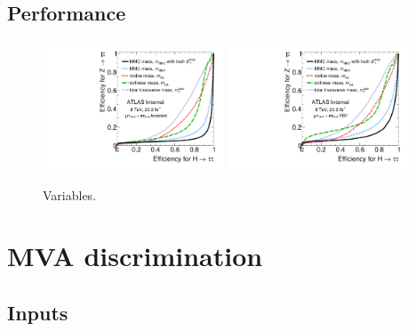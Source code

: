 \subsection{Performance}
\label{sec:strategy-mtautau-performance}

\begin{figure}[tp]
  \centering
  \includegraphics[width=0.48\textwidth]{figures/mtautau/mtautau-boost}
  \includegraphics[width=0.48\textwidth]{figures/mtautau/mtautau-vbf}
  \caption{Variables.}
  \label{fig:strategy-mtautau-ROC}
\end{figure}

\section{MVA discrimination}
\label{sec:strategy-mva}

\subsection{Inputs}
\label{sec:strategy-mva-inputs}

